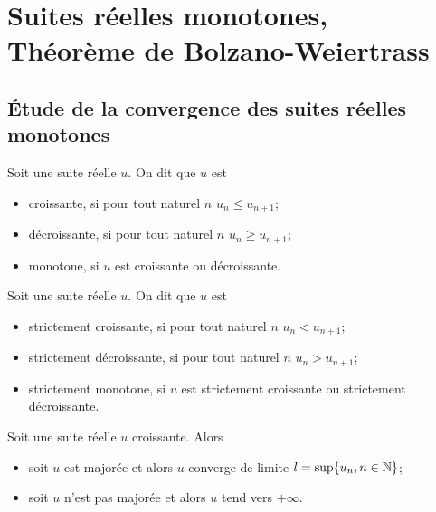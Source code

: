 \section{Suites réelles monotones, Théorème de Bolzano-Weiertrass}

\subsection{Étude de la convergence des suites réelles monotones}

\begin{defdef}
    Soit une suite réelle \(u\). On dit que \(u\) est
    \begin{itemize}
        \item croissante, si pour tout naturel \(n\) \(u_n \leqslant u_{n+1}\);
        \item décroissante, si pour tout naturel \(n\) \(u_n \geqslant u_{n+1}\);
        \item monotone, si \(u\) est croissante ou décroissante.
    \end{itemize}
\end{defdef}
\begin{defdef}
    Soit une suite réelle \(u\). On dit que \(u\) est
    \begin{itemize}
        \item strictement croissante, si pour tout naturel \(n\) \(u_n < u_{n+1}\);
        \item strictement décroissante, si pour tout naturel \(n\) \(u_n >
            u_{n+1}\);
        \item strictement monotone, si \(u\) est strictement croissante ou
            strictement décroissante.
    \end{itemize}
\end{defdef}
\begin{theo}
    Soit une suite réelle \(u\) croissante. Alors
    \begin{itemize}
        \item soit \(u\) est majorée et alors \(u\) converge de limite \(l =
            \sup\{u_n, n \in \mathbb{N}\}\);
        \item soit \(u\) n'est pas majorée et alors \(u\) tend vers \(+\infty\).
    \end{itemize}
\end{theo}
